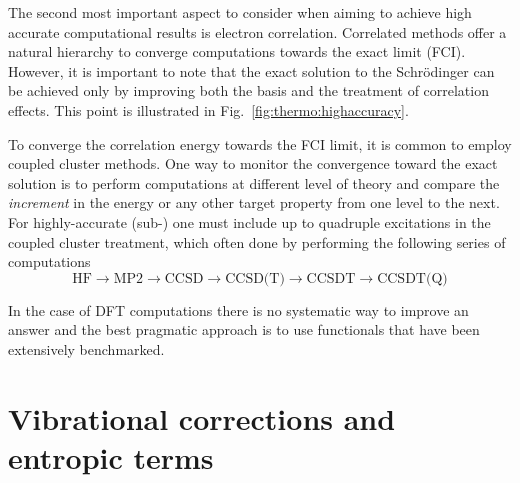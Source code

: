 \documentclass[../Main/notes.tex]{subfiles}
\begin{document}

The second most important aspect to consider when aiming to achieve high accurate computational results is electron correlation.
Correlated methods offer a natural hierarchy to converge computations towards the exact limit (FCI).
However, it is important to note that the exact solution to the Schr\"{o}dinger can be achieved only by improving both the basis and the treatment of correlation effects.
This point is illustrated in Fig.~\ref{fig:thermo:highaccuracy}.

To converge the correlation energy towards the FCI limit, it is common to employ coupled cluster methods.
One way to monitor the convergence toward the exact solution is to perform computations at different level of theory and compare the \emph{increment} in the energy or any other target property from one level to the next.
For highly-accurate (sub-\kcal) one must include up to quadruple excitations in the coupled cluster treatment, which often done by performing the following series of computations
\begin{equation}
\text{HF} \rightarrow \text{MP2} \rightarrow \text{CCSD} \rightarrow \text{CCSD(T)} \rightarrow \text{CCSDT} \rightarrow \text{CCSDT(Q)}
\end{equation}

In the case of DFT computations there is no systematic way to improve an answer and the best pragmatic approach is to use functionals that have been extensively benchmarked.

\section{Vibrational corrections and entropic terms}
\end{document}
